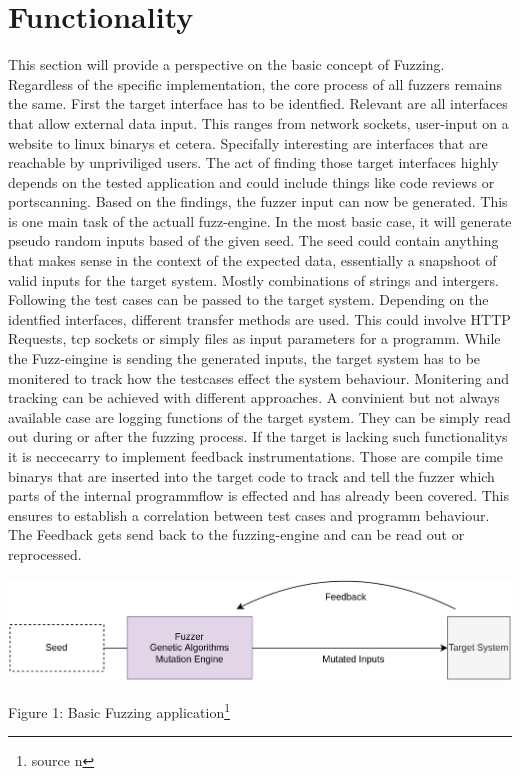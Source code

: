 \documentclass[journal=tosc,final]{iacrtrans}
\begin{document}
\section{Functionality}
This section will provide a perspective on the basic concept of Fuzzing. Regardless of the specific implementation, the core process of all fuzzers remains the same. First the target interface has to be identfied. Relevant are all interfaces that allow external data input. This ranges from network sockets, user-input on a website to linux binarys et cetera. Specifally interesting are interfaces that are reachable by unpriviliged users. The act of finding those target interfaces highly depends on the tested application and could include things like code reviews or portscanning. Based on the findings, the fuzzer input can now be generated. This is one main task of the actuall fuzz-engine. In the most basic case, it will generate pseudo random inputs based of the given seed. The seed could contain anything that makes sense in the context of the expected data, essentially a snapshoot of valid inputs for the target system. Mostly combinations of strings and intergers. Following the test cases can be passed to the  target system. Depending on the identfied interfaces, different transfer methods are used. This could involve HTTP Requests, tcp sockets or simply files as input parameters for a programm. While the Fuzz-eingine is sending the generated inputs, the target system has to be monitered to track how the testcases effect the system behaviour. Monitering and tracking can be achieved with different approaches. A convinient but not always available case are logging functions of the target system. They can be simply read out during or after the fuzzing process. If the target is lacking such functionalitys it is neccecarry to implement feedback instrumentations. Those are compile time binarys that are inserted into the target code to track and tell the fuzzer which parts of the internal programmflow is effected and has already been covered. This ensures to establish a correlation between test cases and programm behaviour. The Feedback gets send back to the fuzzing-engine and can be read out or reprocessed.
\begin{shaded}

\begin{center}
 \includegraphics[scale=0.2]{../final2.png}

\vspace{2mm} Figure 1: Basic Fuzzing application\footnote{source n}
 \end{center}
\end{shaded}
\end{document}
